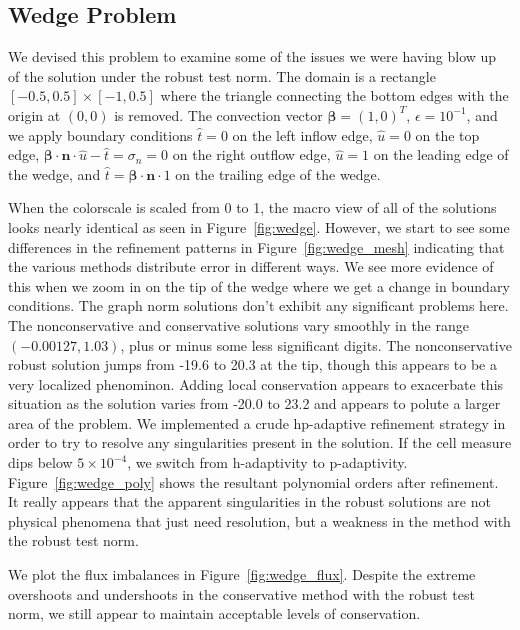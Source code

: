 \documentclass[letterpaper]{article}
\def\bbeta{\boldsymbol\beta}
\begin{document}
\subsection{Wedge Problem}
We devised this problem to examine some of the issues we were having blow up
of the solution under the robust test norm. The domain is a rectangle
$[-0.5,0.5]\times[-1,0.5]$ where the triangle connecting the bottom edges with
the origin at $(0,0)$ is removed. The convection vector $\bbeta=(1,0)^T$,
$\epsilon=10^{-1}$, and we apply boundary conditions $\hat t=0$ on the left
inflow edge, $\hat u=0$ on the top edge, $\bbeta\cdot\mathbf{n}\cdot\hat
u-\hat t=\sigma_n=0$ on the right outflow edge, $\hat u=1$ on the leading edge
of the wedge, and $\hat t=\bbeta\cdot\mathbf{n}\cdot 1$ on the trailing edge
of the wedge.

When the colorscale is scaled from 0 to 1, the macro view of all of the
solutions looks nearly identical as seen in Figure~\ref{fig:wedge}. However,
we start to see some differences in the refinement patterns in
Figure~\ref{fig:wedge_mesh} indicating that the various methods distribute
error in different ways. We see more evidence of this when we zoom in on the
tip of the wedge where we get a change in boundary conditions. The graph norm
solutions don't exhibit any significant problems here. The nonconservative and
conservative solutions vary smoothly in the range $(-0.00127, 1.03)$, plus or
minus some less significant digits. The nonconservative robust solution jumps
from -19.6 to 20.3 at the tip, though this appears to be a very localized
phenominon. Adding local conservation appears to exacerbate this situation as
the solution varies from -20.0 to 23.2 and appears to polute a larger area of
the problem. We implemented a crude hp-adaptive refinement strategy in order
to try to resolve any singularities present in the solution. If the cell
measure dips below $5\times10^{-4}$, we switch from h-adaptivity to
p-adaptivity. Figure~\ref{fig:wedge_poly} shows the resultant polynomial
orders after refinement. It really appears that the apparent singularities in
the robust solutions are not physical phenomena that just need resolution, but
a weakness in the method with the robust test norm.

We plot the flux imbalances in Figure~\ref{fig:wedge_flux}. Despite the
extreme overshoots and undershoots in the conservative method with the robust
test norm, we still appear to maintain acceptable levels of conservation.
\end{document}
